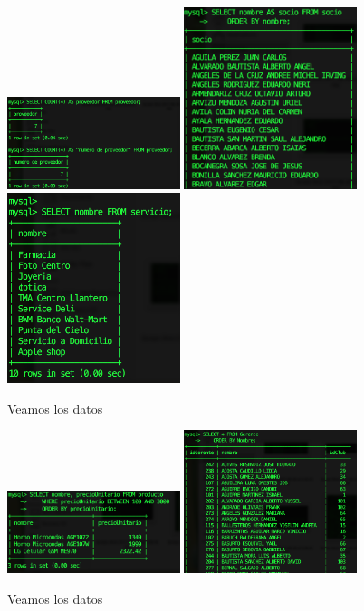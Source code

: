 \documentclass[12pt, fleqn]{article}                             %
\begin{document}
        \begin{figure}[h]
            \includegraphics[width=0.45\textwidth]{DBExterna4}
            \includegraphics[width=0.45\textwidth]{DBExterna5}
            \includegraphics[width=0.45\textwidth]{DBExterna6}
            \caption{Veamos los datos}
        \end{figure}

        \begin{figure}[h]
            \includegraphics[width=0.45\textwidth]{DBExterna7}
            \includegraphics[width=0.45\textwidth]{DBExterna8}
            \caption{Veamos los datos}
        \end{figure}
        \clearpage
        
\end{document}

